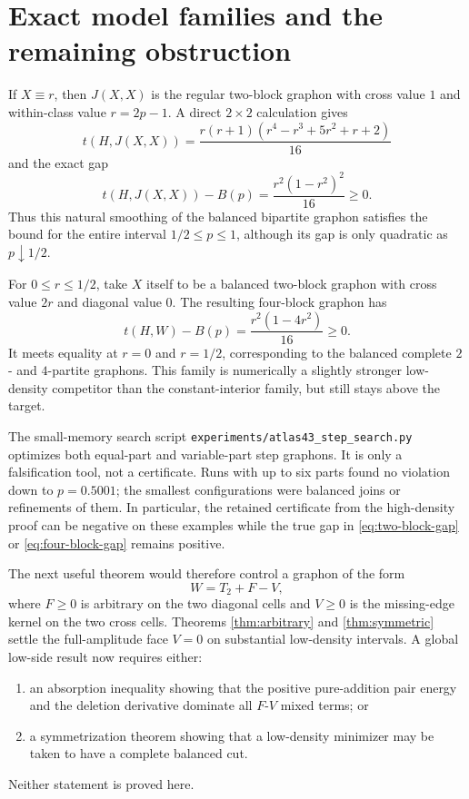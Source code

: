 \documentclass[11pt]{article}
\begin{document}
\section{Exact model families and the remaining obstruction}

If \(X\equiv r\), then \(J(X,X)\) is the regular two-block graphon with
cross value \(1\) and within-class value \(r=2p-1\).  A direct \(2\times2\)
calculation gives
\[
 t(H,J(X,X))
 =\frac{r(r+1)(r^4-r^3+5r^2+r+2)}{16}
\]
and the exact gap
\begin{equation}\label{eq:two-block-gap}
 t(H,J(X,X))-B(p)
 =\frac{r^2(1-r^2)^2}{16}\geq0.
\end{equation}
Thus this natural smoothing of the balanced bipartite graphon satisfies the
bound for the entire interval \(1/2\leq p\leq1\), although its gap is only
quadratic as \(p\downarrow1/2\).

For \(0\leq r\leq1/2\), take \(X\) itself to be a balanced two-block
graphon with cross value \(2r\) and diagonal value \(0\).  The resulting
four-block graphon has
\begin{equation}\label{eq:four-block-gap}
 t(H,W)-B(p)=\frac{r^2(1-4r^2)}{16}\geq0.
\end{equation}
It meets equality at \(r=0\) and \(r=1/2\), corresponding to the balanced
complete \(2\)- and \(4\)-partite graphons.  This family is numerically a
slightly stronger low-density competitor than the constant-interior family,
but still stays above the target.

The small-memory search script
\texttt{experiments/atlas43\_step\_search.py} optimizes both equal-part and
variable-part step graphons.  It is only a falsification tool, not a
certificate.  Runs with up to six parts found no violation down to
\(p=0.5001\); the smallest configurations were balanced joins or refinements
of them.  In particular, the retained certificate from the high-density
proof can be negative on these examples while the true gap in
\eqref{eq:two-block-gap} or \eqref{eq:four-block-gap} remains positive.

The next useful theorem would therefore control a graphon of the form
\[
 W=T_2+F-V,
\]
where \(F\geq0\) is arbitrary on the two diagonal cells and \(V\geq0\) is
the missing-edge kernel on the two cross cells.  Theorems
\ref{thm:arbitrary} and \ref{thm:symmetric} settle the full-amplitude face
\(V=0\) on substantial low-density intervals.  A global low-side result
now requires either:
\begin{enumerate}
 \item an absorption inequality showing that the positive pure-addition
 pair energy and the deletion derivative dominate all \(F\)-\(V\) mixed
 terms; or
 \item a symmetrization theorem showing that a low-density minimizer may be
 taken to have a complete balanced cut.
\end{enumerate}
Neither statement is proved here.
\end{document}
